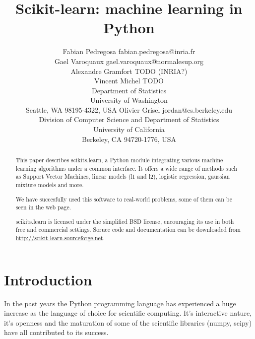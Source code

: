 \documentclass[twoside,11pt]{article}
\begin{document}
\title{Scikit-learn: machine learning in Python}


\author{\name Fabian Pedregosa \email fabian.pedregosa@inria.fr \\
        \name Gael Varoquaux \email gael.varoquaux@normalesup.org  \\
        \name Alexandre Gramfort \email TODO (INRIA?)\\
        \name Vincent Michel  \email TODO \\
       \addr Department of Statistics\\
       University of Washington\\
       Seattle, WA 98195-4322, USA
       \AND
       \name Olivier Grisel \email jordan@cs.berkeley.edu \\
       \addr Division of Computer Science and Department of Statistics\\
       University of California\\
       Berkeley, CA 94720-1776, USA}





\maketitle

\begin{abstract}
This paper describes scikits.learn, a Python module integrating
various machine learning algorithms under a common interface. It
offers a wide range of methods such as Support Vector Machines, linear
models (l1 and l2), logistic regression, gaussian mixture models and
more.

We have succesfully used this software to real-world problems, some of
them can be seen in the web page.

scikits.learn is licensed under the simplified BSD license,
encouraging its use in both free and commercial settings. Soruce code
and documentation can be downloaded from
\url{http://scikit-learn.sourceforge.net}.

\end{abstract}




\section{Introduction}
In the past years the Python programming language has experienced a
huge increase as the language of choice for scientific computing. It's
interactive nature, it's openness and the maturation of some of the
scientific libraries (numpy, scipy) have all contributed to its
success.
\end{document}

